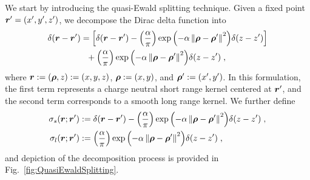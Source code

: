 We start by introducing the quasi-Ewald splitting technique.
Given a fixed point  $\boldsymbol{r}^\prime=(x^{\prime}, y^{\prime},z^{\prime})$, we decompose   the Dirac delta function into
\begin{equation}\label{eq...text...Quasi-EwaldMethod...QuasiEwaldSplitting}
\begin{aligned}
    \delta(\boldsymbol{r}-\boldsymbol{r}^\prime) &= \left[\delta (\boldsymbol{r}-\boldsymbol{r}^\prime) - {\left( \frac{\alpha}{\pi} \right)} \exp{\left(-\alpha \left\lVert\bm{\rho}-\bm{\rho}^\prime\right\rVert^2\right)} \delta(z-z^\prime) \right]\\&~~ + {\left( \frac{\alpha}{\pi} \right)} \exp{\left(-\alpha \left\lVert\bm{\rho}-\bm{\rho}^\prime\right\rVert^2\right)} \delta(z-z^\prime)\;,
    \end{aligned}
\end{equation}
where $\bm{r}:=(\bm{\rho}, z):=(x,y,z)$,   $\bm{\rho}:=(x,y)$, and $\bm{\rho}^\prime:=(x^\prime,y^\prime)$.
 In this formulation, the first term represents  a charge neutral short range kernel centered at $\bm{r}^\prime$, and the second term corresponds to a smooth long range kernel.  We further define  
\begin{equation}\label{eq...text...Kernels}
    \begin{split}
        \sigma_{s}(\boldsymbol{r}; \bm{r}^\prime) &:= \delta (\boldsymbol{r}-\boldsymbol{r}^\prime) - {\left( \frac{\alpha}{\pi} \right)} \exp{\left(-\alpha \left\lVert\bm{\rho}-\bm{\rho}^\prime\right\rVert^2\right)} \delta(z-z^\prime)\;,\\
        \sigma_{l}(\boldsymbol{r};\bm{r}^\prime) &:= {\left( \frac{\alpha}{\pi} \right)} \exp{\left(-\alpha \left\lVert\bm{\rho}-\bm{\rho}^\prime\right\rVert^2\right)} \delta(z-z^\prime)\;,
    \end{split}
\end{equation}
%
%
and  depiction of the decomposition process is provided in Fig.~\ref{fig:QuasiEwaldSplitting}.  

